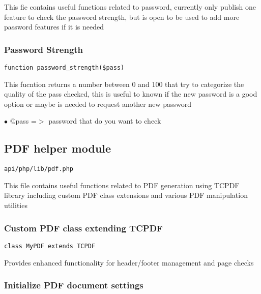 \documentclass[a4paper]{article}
\begin{document}
This fie contains useful functions related to password, currently only publish one feature to check
the password strength, but is open to be used to add more password features if it is needed

\hypertarget{toc500}{}
\subsubsection{Password Strength}

\begin{lstlisting}
function password_strength($pass)
\end{lstlisting}

This fucntion returns a number between 0 and 100 that try to categorize
the quality of the pass checked, this is useful to known if the new
password is a good option or maybe is needed to request another new
password

\begin{compactitem}
\item[\color{myblue}$\bullet$] @pass =$>$ password that do you want to check
\end{compactitem}

\hypertarget{toc501}{}
\subsection{PDF helper module}

\begin{lstlisting}
api/php/lib/pdf.php
\end{lstlisting}

This file contains useful functions related to PDF generation using TCPDF library
including custom PDF class extensions and various PDF manipulation utilities

\hypertarget{toc502}{}
\subsubsection{Custom PDF class extending TCPDF}

\begin{lstlisting}
class MyPDF extends TCPDF
\end{lstlisting}

Provides enhanced functionality for header/footer management and page checks

\hypertarget{toc503}{}
\subsubsection{Initialize PDF document settings}
\end{document}
